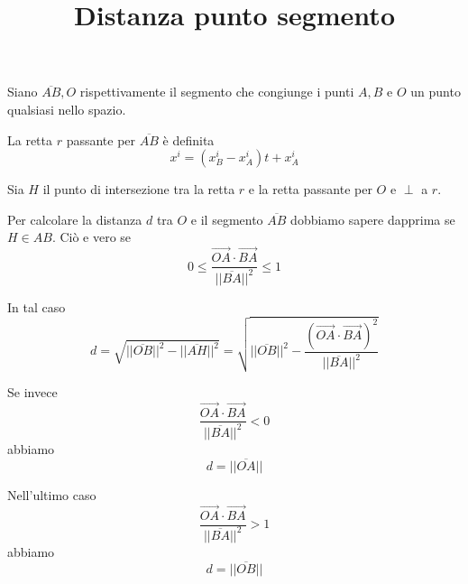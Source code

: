 \documentclass[10pt,a4paper]{article}
\title{Distanza punto segmento}
\begin{document}
Siano $ \overline{AB}, O $ rispettivamente il segmento che congiunge i punti $ A, B $ e $ O $ un punto qualsiasi nello spazio.

La retta $ r $ passante per $ \overline{AB} $ è definita
\[
   x^i = ( x_B^i - x_A^i ) t + x_A^i 
\]

Sia $ H $ il punto di intersezione tra la retta $ r $ e la retta passante per $ O $ e $ \perp $ a  $ r $.

Per calcolare la distanza $ d $ tra $ O $ e il segmento $ \overline{AB} $ dobbiamo
sapere dapprima se $ H \in AB $. Ciò e vero se
\[
0 \le \frac{\vec{OA} \cdot \vec{BA}} {|| \overline{BA} || ^ 2} \le 1
\]

In tal caso
\begin{equation}
	d = \sqrt{|| \overline{OB} || ^ 2 - || \overline{AH} || ^ 2}
	  = \sqrt{|| \overline{OB} || ^ 2
	  - \frac{(\vec{OA} \cdot \vec{BA}) ^ 2} {|| \overline{BA} || ^ 2}}
\end{equation}

Se invece 
\[
\frac{\vec{OA} \cdot \vec{BA}} {|| \overline{BA} || ^ 2} < 0
\]
abbiamo
\begin{equation}
	d = || \overline{OA} ||
\end{equation}

Nell'ultimo caso 
\[
\frac{\vec{OA} \cdot \vec{BA}} {|| \overline{BA} || ^ 2} > 1
\]
abbiamo
\begin{equation}
	d = || \overline{OB} ||
\end{equation}
\end{document}
